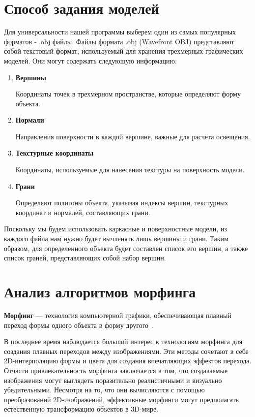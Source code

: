 \section[Способ задания моделей]{Способ задания моделей}
\label{sec:method_set_models}

Для универсальности нашей программы выберем один из самых популярных форматов - .obj файлы. 
Файлы формата .obj (Wavefront OBJ) представляют собой текстовый формат, используемый для хранения трехмерных графических 
моделей. 
Они могут содержать следующую информацию:
\begin{enumerate}
	\item \textbf{Вершины}
	
	Координаты точек в трехмерном пространстве, которые определяют форму объекта.
	
	\item \textbf{Нормали}
	
	Направления поверхности в каждой вершине, важные для расчета освещения.
	
	\item \textbf{Текстурные координаты}
	
	Координаты, используемые для нанесения текстуры на поверхность модели.
	
	\item \textbf{Грани}
	
	Определяют полигоны объекта, указывая индексы вершин, текстурных координат и нормалей, составляющих грани.
\end{enumerate}

Поскольку мы будем использовать каркасные и поверхностные модели, из каждого файла нам нужно будет вычленять лишь вершины и грани. 
Таким образом, для определенного объекта будет составлен список его вершин, а также список граней, представляющих собой набор вершин.

\section[Анализ алгоритмов морфинга]{Анализ алгоритмов морфинга}
\label{sec:morph_algo}
\textbf{Морфинг} --- технология компьютерной графики, обеспечивающая плавный переход формы одного объекта в форму другого~\cite{morph_spheres}.

В последнее время наблюдается большой интерес к технологиям морфинга для создания плавных переходов между изображениями. 
Эти методы сочетают в себе 2D-интерполяцию формы и цвета для создания впечатляющих эффектов перехода.
Отчасти привлекательность морфинга заключается в том, что создаваемые изображения могут выглядеть поразительно реалистичными и визуально убедительными. 
Несмотря на то, что они вычисляются с помощью преобразований 2D-изображений, эффективные морфинги могут предполагать естественную трансформацию объектов в 3D-мире.


